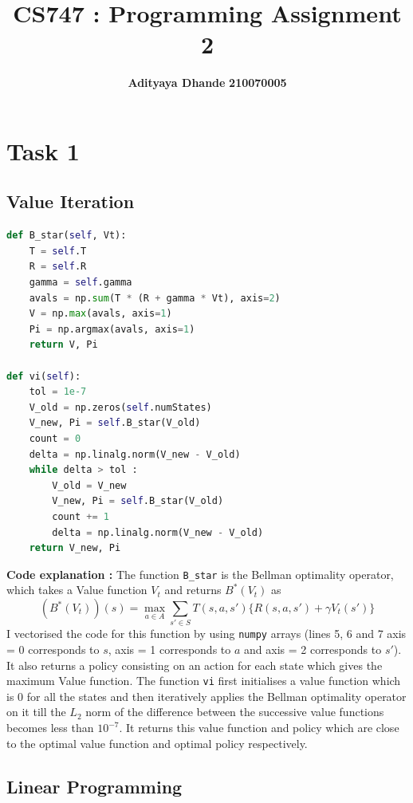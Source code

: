 \documentclass[11pt]{article}
\title{\textbf{CS747 : Programming Assignment 2}}
\author{\textbf{Adityaya Dhande}   \hspace{8mm} \textbf{210070005}}
\begin{document}
\maketitle
\section*{Task 1}

\subsection*{Value Iteration}
\begin{lstlisting}[language=Python]      
def B_star(self, Vt):
    T = self.T 
    R = self.R 
    gamma = self.gamma        
    avals = np.sum(T * (R + gamma * Vt), axis=2)
    V = np.max(avals, axis=1)
    Pi = np.argmax(avals, axis=1)
    return V, Pi

def vi(self):
    tol = 1e-7
    V_old = np.zeros(self.numStates)
    V_new, Pi = self.B_star(V_old)
    count = 0
    delta = np.linalg.norm(V_new - V_old)
    while delta > tol :
        V_old = V_new
        V_new, Pi = self.B_star(V_old)
        count += 1
        delta = np.linalg.norm(V_new - V_old)
    return V_new, Pi
\end{lstlisting}
\noindent
\textbf{Code explanation :} The function \texttt{B\_star} is the Bellman optimality 
operator, which takes a Value function $V_t$ and returns $B^* (V_t)$ as $$ 
(B^*(V_t))(s) = \max_{a \in A} \sum\limits_{s' \in S} T(s, a, s')\{R(s, a, s') + \gamma V_t(s')\}
$$ I vectorised the 
code for this function by using \texttt{numpy} arrays (lines 5, 6 and 7 axis = 0 corresponds
to $s$, axis = 1 corresponds to $a$ and axis = 2 corresponds to $s'$). It also returns a 
policy consisting on an action for each state which gives the maximum Value function. 
The function \texttt{vi} first initialises a value function which is 0 for all the states and then
iteratively applies the Bellman optimality operator on it till the $L_2$ norm of the difference between the successive 
value functions becomes less than $10^{-7}$. It returns this value function and policy which are close to the
optimal value function and optimal policy respectively. 
    \newpage
   \subsection*{Linear Programming}
\end{document}
